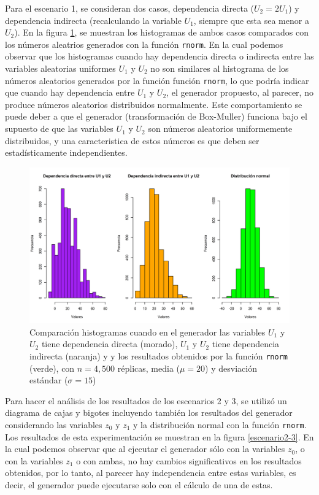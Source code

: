 \documentclass{article}
\begin{document}
Para el escenario 1, se consideran dos casos, dependencia directa ($U_{2} = 2U_{1}$) y dependencia indirecta (recalculando la variable $U_{1}$, siempre que esta sea menor a $U_{2}$). En la figura \ref{escenario1}, se muestran los histogramas de ambos casos comparados con los números aleatrios generados con la función \texttt{rnorm}. En la cual podemos observar que los histogramas cuando hay dependencia directa o indirecta entre las variables aleatorias uniformes $U_{1}$ y $U_{2}$ no son similares al histograma de los números aleatorios generados por la función función \texttt{rnorm}, lo que podría indicar que cuando hay dependencia entre $U_{1}$ y $U_{2}$, el generador propuesto, al parecer, no produce números aleatorios distribuidos normalmente. Este comportamiento se puede deber a que el generador (transformación de Box-Muller) funciona bajo el supuesto de que las variables $U_{1}$ y $U_{2}$ son números aleatorios uniformemente distribuidos, y una caracteristica de estos números es que deben ser estadísticamente independientes.

\begin{figure}
\centering
\includegraphics[width=\linewidth]{Figures/comparativosU.png}
\caption{Comparación histogramas cuando en el generador las variables $U_{1}$ y $U_{2}$ tiene dependencia directa (morado), $U_{1}$ y $U_{2}$ tiene dependencia indirecta (naranja) y y los resultados obtenidos por la función \texttt{rnorm} (verde), con $n= 4,500$ réplicas, media ($\mu = 20$) y desviación estándar ($\sigma = 15$)}
\label{escenario1}
\end{figure}


Para hacer el análisis de los resultados de los escenarios 2 y 3, se utilizó un diagrama de cajas y bigotes incluyendo también los resultados del generador considerando las variables $z_{0}$ y $z_{1}$ y la distribución normal con la función \texttt{rnorm}. Los resultados de esta experimentación se muestran en la figura \ref{escenario2-3}. En la cual podemos observar que al ejecutar el generador sólo con la variables $z_{0}$, o con la variables $z_{1}$ o con ambas, no hay cambios significativos en los resultados obtenidos, por lo tanto, al parecer hay independencia entre estas variables, es decir, el generador puede ejecutarse solo con el cálculo de una de estas.
\end{document}
